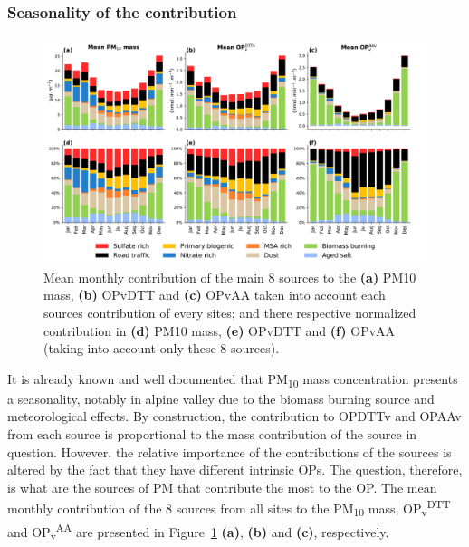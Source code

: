 \documentclass[acp]{copernicus}
\begin{document}
\subsubsection{Seasonality of the contribution}%
\label{seasonality-of-the-contribution}

\begin{figure}[ht]
    \centering
    \includegraphics[width=1.0\linewidth]{figures/fig6}
    \caption{
    Mean monthly contribution of the main 8 sources to the \textbf{(a)} PM10 mass, \textbf{(b)}
    OPvDTT and \textbf{(c)} OPvAA taken into account each sources contribution of every
    sites; and there respective normalized contribution in \textbf{(d)} PM10 mass, \textbf{(e)}
    OPvDTT and \textbf{(f)} OPvAA (taking into account only these 8 sources). 
    }%
    \label{fig:fig6}
\end{figure}

It is already known and well documented that PM\textsubscript{10} mass
concentration presents a seasonality, notably in alpine valley due to
the biomass burning source and meteorological effects. By construction,
the contribution to OPDTTv and OPAAv from each source is proportional to
the mass contribution of the source in question. However, the relative
importance of the contributions of the sources is altered by the fact
that they have different intrinsic OPs. The question, therefore, is what
are the sources of PM that contribute the most to the OP. The mean
monthly contribution of the 8 sources from all sites to the
PM\textsubscript{10} mass, OP\textsubscript{v}\textsuperscript{DTT} and
OP\textsubscript{v}\textsuperscript{AA} are presented in
Figure~\ref{fig:fig6} \textbf{(a)},
\textbf{(b)} and \textbf{(c)}, respectively.
\end{document}
